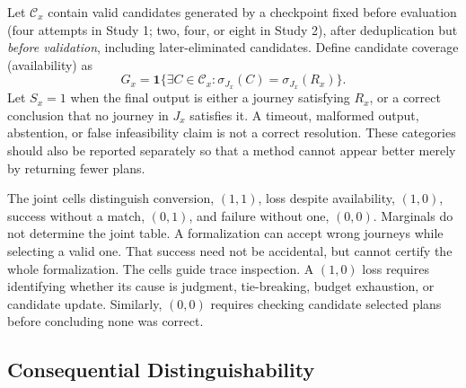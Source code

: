 \documentclass[a4paper,twoside]{article}
\begin{document}
Let $\mathcal C_x$ contain valid candidates generated by a checkpoint fixed before evaluation (four attempts in Study 1; two, four, or eight in Study 2), after deduplication but \emph{before validation}, including later-eliminated candidates. Define candidate coverage (availability) as
\begin{equation}
 G_x=\mathbf{1}\{\exists C\in\mathcal{C}_x:
                 \sigma_{J_x}(C)=\sigma_{J_x}(R_x)\}.
\end{equation}
Let $S_x=1$ when the final output is either a journey satisfying $R_x$, or a correct conclusion that no journey in $J_x$ satisfies it. A timeout, malformed output, abstention, or false infeasibility claim is not a correct resolution. These categories should also be reported separately so that a method cannot appear better merely by returning fewer plans.

The joint cells distinguish conversion, $(1,1)$, loss despite availability, $(1,0)$, success without a match, $(0,1)$, and failure without one, $(0,0)$. Marginals do not determine the joint table. A formalization can accept wrong journeys while selecting a valid one. That success need not be accidental, but cannot certify the whole formalization.
The cells guide trace inspection. A $(1,0)$ loss requires identifying whether its cause is judgment, tie-breaking, budget exhaustion, or candidate update. Similarly, $(0,0)$ requires checking candidate selected plans before concluding none was correct.


\subsection{Consequential Distinguishability}
\end{document}
